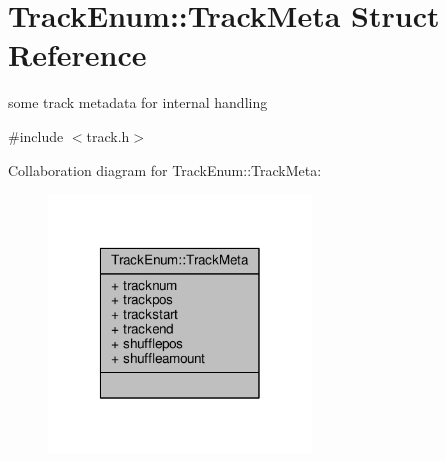 \hypertarget{structTrackEnum_1_1TrackMeta}{\section{Track\-Enum\-:\-:Track\-Meta Struct Reference}
\label{structTrackEnum_1_1TrackMeta}
}


some track metadata for internal handling  




{\ttfamily \#include $<$track.\-h$>$}



Collaboration diagram for Track\-Enum\-:\-:Track\-Meta\-:\nopagebreak
\begin{figure}[H]
\begin{center}
\leavevmode
\includegraphics[width=198pt]{structTrackEnum_1_1TrackMeta__coll__graph}
\end{center}
\end{figure}
